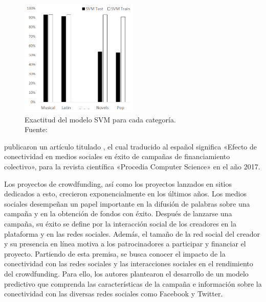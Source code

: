 \begin{figure}[!ht]
	\begin{center}
		\includegraphics[width=0.50\textwidth]{2/figures/sawhney2016.png}
		\caption[Exactitud del modelo SVM para cada categoría]{Exactitud del modelo SVM para cada categoría.\\
			Fuente: \cite{pr_sawhney2016usingLT}}
		\label{2:fig119}
	\end{center}
\end{figure}

\cite{pr_kaur2017socmedcrowd} publicaron un artículo titulado , el cual traducido al español significa «Efecto de conectividad en medios sociales en éxito de campañas de financiamiento colectivo», para la revista científica «Procedia Computer Science» en el año 2017.

Los proyectos de crowdfunding, así como los proyectos lanzados en sitios dedicados a esto, crecieron exponencialmente en los últimos años. Los medios sociales desempeñan un papel importante en la difusión de palabras sobre una campaña y en la obtención de fondos con éxito. Después de lanzarse una campaña, su éxito se define por la interacción social de los creadores en la plataforma y en las redes sociales. Además, el tamaño de la red social del creador y su presencia en línea motiva a los patrocinadores a participar y financiar el proyecto. Partiendo de esta premisa, se busca conocer el impacto de la conectividad con las redes sociales y las interacciones sociales en el rendimiento del crowdfunding. Para ello, los autores plantearon el desarrollo de un modelo predictivo que comprenda las características de la campaña e información sobre la conectividad con las diversas redes sociales como Facebook y Twitter.

